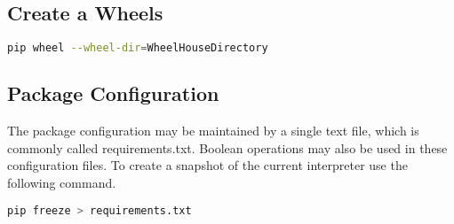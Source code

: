 \subsection{Create a Wheels}
\begin{lstlisting}[language=bash, numbers=none]
pip wheel --wheel-dir=WheelHouseDirectory
\end{lstlisting}

\subsection{Package Configuration}
The package configuration may be maintained by a single text file, which is
commonly called requirements.txt. Boolean operations may also be used in these
configuration files. To create a snapshot of the current interpreter use the
following command.
\begin{lstlisting}[language=bash, numbers=none]
pip freeze > requirements.txt
\end{lstlisting}
